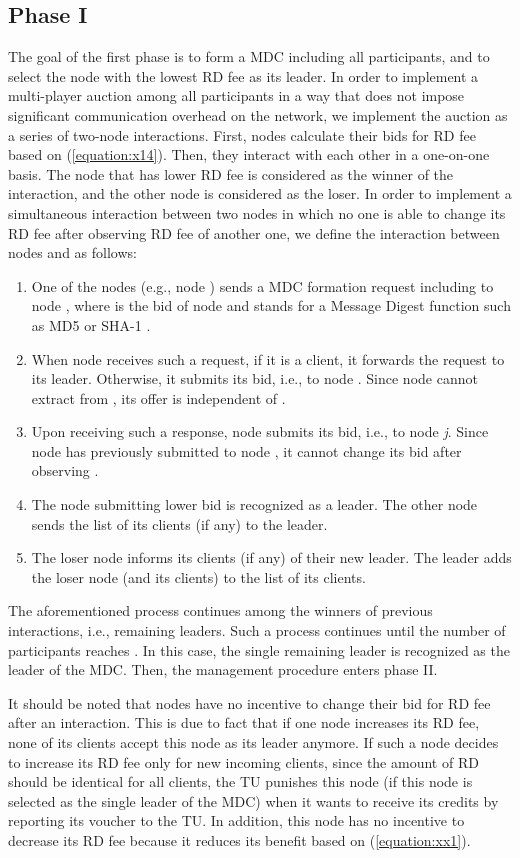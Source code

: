 \documentclass[journal,12pt, onecolumn]{IEEEtran}
\begin{document}
\subsection{Phase I}\label{section:Phase1}
The goal of the first phase is to form a MDC including all participants, and to select the node with the lowest RD fee as its leader. In order to implement a multi-player auction among all participants in a way that does not impose significant communication overhead on the network, we implement the auction as a series of two-node interactions.  
First, nodes calculate their bids for RD fee based on (\ref{equation:x14}). Then, they interact with each other in a one-on-one basis. The node that has lower RD fee is considered as the winner of the interaction, and the other node is considered as the loser. In order to implement a simultaneous interaction between two nodes in which no one is able to change its RD fee after observing RD fee of another one, we define the interaction between nodes  and  as follows:
\begin{enumerate}
\item One of the nodes (e.g., node ) sends a MDC formation request including  to node , where  is the bid of node  and  stands for a Message Digest function such as MD5 \cite{x30} or SHA-1 \cite{x31}.
\item When node  receives such a request, if it is a client, it forwards the request to its leader. Otherwise, it submits its bid, i.e.,  to node . Since node  cannot extract  from , its offer is independent of .
\item Upon receiving such a response, node  submits its bid, i.e.,  to node \textit{j}. Since node  has previously submitted  to node , it cannot change its bid after observing . 
\item The node submitting lower bid is recognized as a leader. The other node sends the list of its clients (if any) to the leader. 
\item The loser node informs its clients (if any) of their new leader. The leader adds the loser node (and its clients) to the list of its clients.

\end{enumerate}
The aforementioned process continues among the winners of previous interactions, i.e., remaining leaders. Such a process continues until the number of participants reaches . In this case, the single remaining leader is recognized as the leader of the MDC. Then, the management procedure enters phase II.

It should be noted that nodes have no incentive to change their bid for RD fee after an interaction. This is due to fact that if one node increases its RD fee, none of its clients accept this node as its leader anymore. If such a node decides to increase its RD fee only for new incoming clients, since the amount of RD should be identical for all clients, the TU punishes this node (if this node is selected as the single leader of the MDC) when it wants to receive its credits by reporting its voucher to the TU. In addition, this node has no incentive to decrease its RD fee because it reduces its benefit based on (\ref{equation:xx1}).
\end{document}
